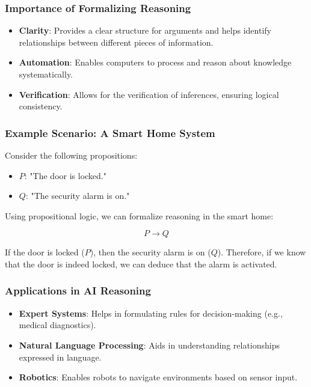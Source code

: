 \documentclass[aspectratio=169]{beamer}
\begin{document}
\begin{frame}[fragile]
    \frametitle{Importance of Formalizing Reasoning}
    \begin{itemize}
        \item \textbf{Clarity}: Provides a clear structure for arguments and helps identify relationships between different pieces of information.
        \item \textbf{Automation}: Enables computers to process and reason about knowledge systematically.
        \item \textbf{Verification}: Allows for the verification of inferences, ensuring logical consistency.
    \end{itemize}
\end{frame}

\begin{frame}[fragile]
    \frametitle{Example Scenario: A Smart Home System}
    Consider the following propositions:
    \begin{itemize}
        \item $P$: "The door is locked."
        \item $Q$: "The security alarm is on."
    \end{itemize}
    
    Using propositional logic, we can formalize reasoning in the smart home:
    
    \begin{equation}
        P \rightarrow Q
    \end{equation}

    If the door is locked ($P$), then the security alarm is on ($Q$). Therefore, if we know that the door is indeed locked, we can deduce that the alarm is activated.
\end{frame}

\begin{frame}[fragile]
    \frametitle{Applications in AI Reasoning}
    \begin{itemize}
        \item \textbf{Expert Systems}: Helps in formulating rules for decision-making (e.g., medical diagnostics).
        \item \textbf{Natural Language Processing}: Aids in understanding relationships expressed in language.
        \item \textbf{Robotics}: Enables robots to navigate environments based on sensor input.
    \end{itemize}
\end{frame}
\end{document}
